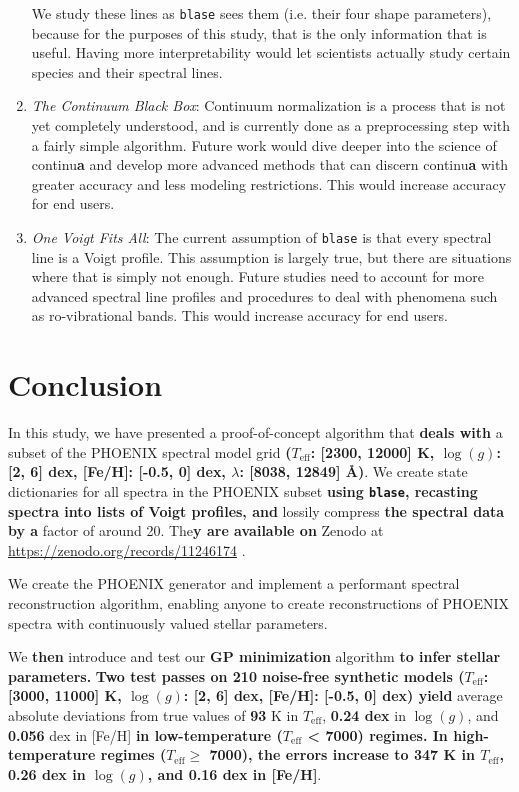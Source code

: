 \documentclass[twocolumn, linenumbers]{aastex631}
\begin{document}
\begin{enumerate}[label=-]
    We study these lines as \texttt{blase} sees them (i.e. their four shape parameters), because for the purposes of this study, that is the only information that is useful.
    Having more interpretability would let scientists actually study certain species and their spectral lines.
    \item \textit{The Continuum Black Box}: Continuum normalization is a process that is not yet completely understood, and is currently done as a preprocessing step with a fairly simple algorithm.
    Future work would dive deeper into the science of continu\textbf{a} and develop more advanced methods that can discern continu\textbf{a} with greater accuracy and less modeling restrictions.
    This would increase accuracy for end users.
    \item \textit{One Voigt Fits All}: The current assumption of \texttt{blase} is that every spectral line is a Voigt profile.
    This assumption is largely true, but there are situations where that is simply not enough.
    Future studies need to account for more advanced spectral line profiles and procedures to deal with phenomena such as ro-vibrational bands.
    This would increase accuracy for end users.
\end{enumerate}

\section{Conclusion}
In this study, we have presented a proof-of-concept algorithm that \textbf{deals with} a subset of the PHOENIX spectral model grid \textbf{($T_\text{eff}$: [2300, 12000] K, $\log(g)$: [2, 6] dex, [Fe/H]: [-0.5, 0] dex, $\lambda$: [8038, 12849] \AA)}.
We create state dictionaries for all spectra in the PHOENIX subset \textbf{using \texttt{blase}, recasting spectra into lists of Voigt profiles, and} lossily compress \textbf{the spectral data by a} factor of around 20. 
The\textbf{y are available on} Zenodo at \url{https://zenodo.org/records/11246174} \citep{zenodo}.

We create the PHOENIX generator and implement a performant spectral reconstruction algorithm, enabling anyone to create reconstructions of PHOENIX spectra with continuously valued stellar parameters.

We \textbf{then} introduce and test our \textbf{GP minimization} algorithm \textbf{to infer stellar parameters.} 
\textbf{Two test passes on 210 noise-free synthetic models ($T_{\mathrm{eff}}$: [3000, 11000] K, $\log(g)$: [2, 6] dex, [Fe/H]: [-0.5, 0] dex) yield} average absolute deviations from true values of \textbf{93} K in $T_\mathrm{eff}$, \textbf{0.24 dex} in $\log(g)$, and \textbf{0.056} dex in [Fe/H] \textbf{in low-temperature ($T_\mathrm{eff}$ < 7000) regimes.
In high-temperature regimes ($T_\text{eff} \ge$ 7000), the errors increase to 347 K in $T_\mathrm{eff}$, 0.26 dex in $\log(g)$, and 0.16 dex in [Fe/H]}.
\end{document}
